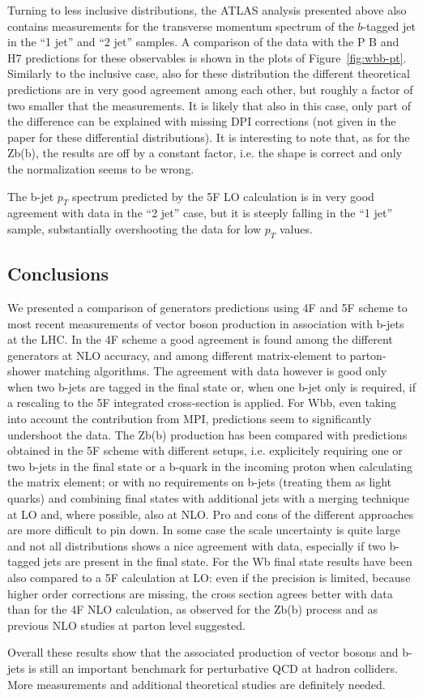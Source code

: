 \documentclass[11pt]{cernrep}
\newcommand{\Herwig}{H\protect\scalebox{0.8}{ERWIG}7\xspace}
\newcommand{\POWHEGBOX}{P\protect\scalebox{0.8}{OWHEG} B\protect\scalebox{0.8}{OX}\xspace}
\begin{document}
Turning to less inclusive distributions, the ATLAS analysis presented
above also contains measurements for the transverse momentum spectrum
of the $b$-tagged jet in the ``1 jet'' and ``2 jet'' samples. A
comparison of the data with the \POWHEGBOX{} and \Herwig predictions
for these observables is shown in the plots of
Figure~\ref{fig:wbb-pt}. Similarly to the inclusive case, also for
these distribution the different theoretical predictions are in very
good agreement among each other, but roughly a factor of two smaller
that the measurements. It is likely that also in this case, only part of
the difference can be explained with missing DPI corrections (not given in the paper for these differential distributions). 
It is interesting to note that, as for the Zb(b), the results are off by a constant factor, i.e. the shape is correct and only
the normalization seems to be wrong. 

The b-jet $p_T$ spectrum predicted by the 5F LO calculation is in very good agreement with data in the ``2 jet'' case, but it
is steeply falling in the ``1 jet'' sample, substantially overshooting the data for low $p_T$ values.



\subsection{Conclusions \label{concl}}

We presented a comparison of generators predictions using 4F and 5F scheme to most recent
measurements of vector boson production in association with b-jets at the LHC. In the 4F scheme a good agreement is found among the
different generators at NLO accuracy, and among different matrix-element to parton-shower matching algorithms. The
agreement with data however is good only when two b-jets are tagged in the final state or, when one b-jet only is
required, if a rescaling to the 5F integrated cross-section is applied. For Wbb, even taking into account the contribution from MPI,
predictions seem to significantly undershoot the data. The Zb(b) production has been
compared with predictions obtained in the 5F scheme with different setups, i.e. explicitely requiring one or two b-jets
in the final state or a b-quark in the incoming proton when calculating the matrix element; or with no requirements on
b-jets (treating them as light quarks) and combining final states with additional jets with a merging technique at LO
and, where possible, also at NLO. Pro and cons of the different approaches are more difficult to pin down. In some case
the scale uncertainty is quite large and not all distributions shows a nice agreement with data, especially if two
b-tagged jets are present in the final state. For the Wb final state results have been also compared to a 5F calculation at LO:
even if the precision is limited, because higher order corrections are missing, the cross section
agrees better with data than for the 4F NLO calculation, as observed for the Zb(b) process and as previous NLO studies at parton
level suggested. 

Overall these results show that the associated production of vector bosons and b-jets is still an important benchmark for
perturbative QCD at hadron colliders. More measurements and additional theoretical studies are definitely needed.


\end{document}
